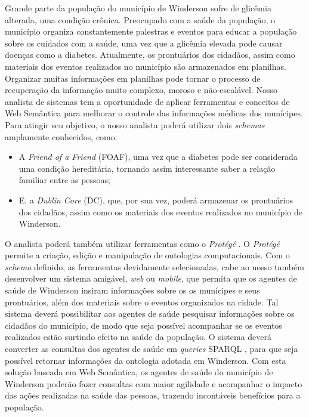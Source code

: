Grande parte da população do município de Winderson sofre de glicêmia alterada, uma condição crônica. Preocupado com a saúde da população, o município organiza constantemente palestras e eventos para educar a população sobre os cuidados com a saúde, uma vez que a glicêmia elevada pode causar doenças como a diabetes. Atualmente, os prontuários dos cidadãos, assim como materiais dos eventos realizados no município são armazenados em planilhas. Organizar muitas informações em planilhas pode tornar o processo de recuperação da informação muito complexo, moroso e não-escalável. Nosso analista de sistemas tem a oportunidade de aplicar ferramentas e conceitos de Web Semântica \cite{berners2001semantic} para melhorar o controle das informações médicas dos munícipes. Para atingir seu objetivo, o nosso analista poderá utilizar dois \textit{schemas} amplamente conhecidos, como:

\begin{itemize}
    \item A \textit{Friend of a Friend} \cite{graves2007foaf} (FOAF), uma vez que a diabetes pode ser considerada uma condição hereditária, tornando assim interessante saber a relação familiar entre as pessoas;
    
    \item E, a \textit{Dublin Core} \cite{baker2000grammar} (DC), que, por sua vez, poderá armazenar os prontuários dos cidadãos, assim como os materiais dos eventos realizados no município de Winderson.
\end{itemize}
    
O analista poderá também utilizar ferramentas como o \textit{Protégé} \cite{gennari2003evolution}. O \textit{Protégé} permite a criação, edição e manipulação de ontologias computacionais. Com o \textit{schema} definido, as ferramentas devidamente selecionadas, cabe ao nosso também desenvolver um sistema amigável, \textit{web} ou \textit{mobile}, que permita que os agentes de saúde de Winderson insiram informações sobre os os munícipes e seus prontuários, além dos materiais sobre o eventos organizados na cidade. Tal sistema deverá possibilitar aos agentes de saúde pesquisar informações sobre os cidadãos do município, de modo que seja possível acompanhar se os eventos realizados estão surtindo efeito na saúde da população. O sistema deverá converter as consultas dos agentes de saúde em \textit{queries} SPARQL \cite{perez2009semantics}, para que seja possível retornar informações da ontologia adotada em Winderson. Com esta solução baseada em Web Semântica, os agentes de saúde do município de Winderson poderão fazer consultas com maior agilidade e acompanhar o impacto das ações realizadas na saúde das pessoas, trazendo incontáveis benefícios para a população.